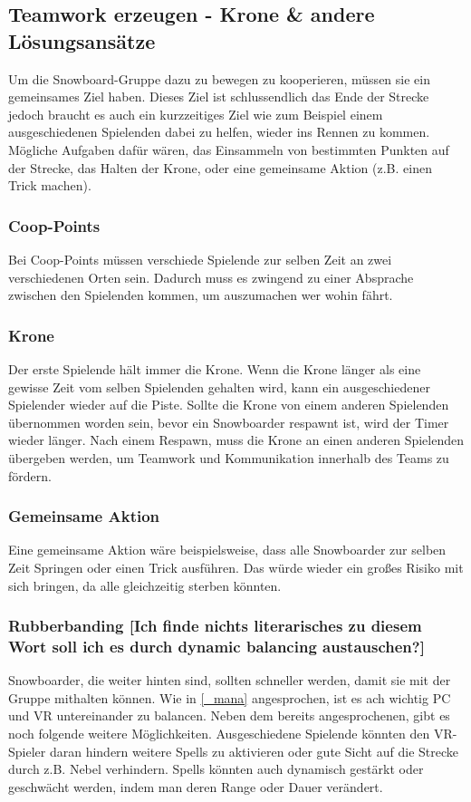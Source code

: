 \subsection{Teamwork erzeugen - Krone \& andere Lösungsansätze\label{_teamwork_erzeugen}}
Um die Snowboard-Gruppe dazu zu bewegen zu kooperieren, müssen sie ein gemeinsames Ziel haben. Dieses Ziel ist schlussendlich das Ende der Strecke jedoch braucht es auch ein kurzzeitiges Ziel wie zum Beispiel einem ausgeschiedenen Spielenden dabei zu helfen, wieder ins Rennen zu kommen. Mögliche Aufgaben dafür wären, das Einsammeln von bestimmten Punkten auf der Strecke, das Halten der Krone, oder eine gemeinsame Aktion (z.B. einen Trick machen).

\subsubsection{Coop-Points}
Bei Coop-Points müssen verschiede Spielende zur selben Zeit an zwei verschiedenen Orten sein. Dadurch muss es zwingend zu einer Absprache zwischen den Spielenden kommen, um auszumachen wer wohin fährt.

\subsubsection{Krone\label{_krone}}
Der erste Spielende hält immer die Krone. Wenn die Krone länger als eine gewisse Zeit vom selben Spielenden gehalten wird, kann ein ausgeschiedener Spielender wieder auf die Piste. Sollte die Krone von einem anderen Spielenden übernommen worden sein, bevor ein Snowboarder respawnt ist, wird der Timer wieder länger. Nach einem Respawn, muss die Krone an einen anderen Spielenden übergeben werden, um Teamwork und Kommunikation innerhalb des Teams zu fördern.

\subsubsection{Gemeinsame Aktion}
Eine gemeinsame Aktion wäre beispielsweise, dass alle Snowboarder zur selben Zeit Springen oder einen Trick ausführen. Das würde wieder ein großes Risiko mit sich bringen, da alle gleichzeitig sterben könnten.

\subsubsection{Rubberbanding [Ich finde nichts literarisches zu diesem Wort soll ich es durch dynamic balancing austauschen?]\label{_rubberbanding}}
Snowboarder, die weiter hinten sind, sollten schneller werden, damit sie mit der Gruppe mithalten können. Wie in \ref{_mana} angesprochen, ist es ach wichtig PC und VR untereinander zu balancen. Neben dem bereits angesprochenen, gibt es noch folgende weitere Möglichkeiten. Ausgeschiedene Spielende könnten den VR-Spieler daran hindern weitere Spells zu aktivieren oder gute Sicht auf die Strecke durch z.B. Nebel verhindern. Spells könnten auch dynamisch gestärkt oder geschwächt werden, indem man deren Range oder Dauer verändert.
